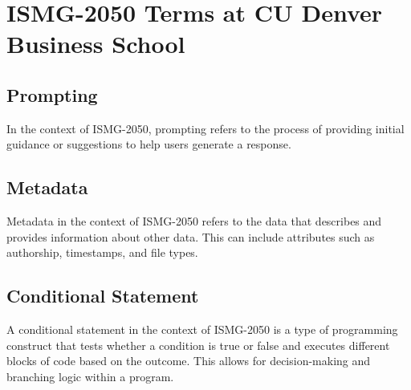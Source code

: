 \documentclass{article}
\begin{document}
\section*{ISMG-2050 Terms at CU Denver Business School}

\subsection*{Prompting}
In the context of ISMG-2050, prompting refers to the process of providing initial guidance or suggestions to help users generate a 
response.

\subsection*{Metadata}
Metadata in the context of ISMG-2050 refers to the data that describes and provides information about other data. This can include 
attributes such as authorship, timestamps, and file types.

\subsection*{Conditional Statement}
A conditional statement in the context of ISMG-2050 is a type of programming construct that tests whether a condition is true or 
false and executes different blocks of code based on the outcome. This allows for decision-making and branching logic within a 
program.
\end{document}
